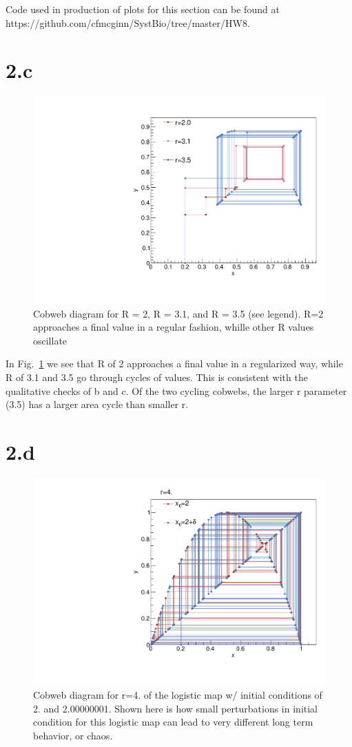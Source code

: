 \documentclass{article}
\begin{document}
Code used in production of plots for this section can be found at https://github.com/cfmcginn/SystBio/tree/master/HW8.
\section{2.c}

\begin{figure}[H]
    \centering
    \includegraphics[width=.45\textwidth]{cobWeb.pdf} 
    \caption{Cobweb diagram for R = 2, R = 3.1, and R = 3.5 (see legend). R=2 approaches a final value in a regular fashion, whille other R values oscillate}
    \label{fig:fig1}
\end{figure}

In Fig.~\ref{fig:fig1} we see that R of 2 approaches a final value in a regularized way, while R of 3.1 and 3.5 go through cycles of values. This is consistent with the qualitative checks  of b and c. Of the two cycling cobwebs, the larger r parameter (3.5) has a larger area cycle than smaller r.

\section{2.d}

\begin{figure}[H]
    \centering
    \includegraphics[width=.45\textwidth]{cobWeb2.pdf} 
    \caption{Cobweb diagram for r=4. of the logistic map w/ initial conditions of 2. and 2.00000001. Shown here is how small perturbations in initial condition for this logistic map can lead to very different long term behavior, or chaos.}
    \label{fig2}
\end{figure}
\end{document}
